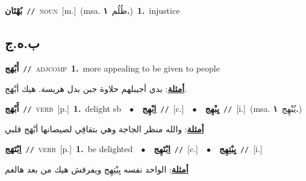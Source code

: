 \documentclass[10pt,a4paper,twoside]{article} %
\begin{document}
\begin{multicols}{2}
{\setlength\topsep{0pt}\textbf{\foreignlanguage{arabic}{بُهْتَان}}\ {\color{gray}\texttt{//}\color{black}}\ \textsc{noun}\ [m.]\ \color{gray}(msa. \foreignlanguage{arabic}{ظُلُم}~\foreignlanguage{arabic}{\textbf{١.}})\color{black}\ \textbf{1.}~injustice\ } \vspace{2mm}

\vspace{-3mm}
\subsection*{\color{blue}\foreignlanguage{arabic}{ب.ه.ج}\color{blue}{}} 

{\setlength\topsep{0pt}\textbf{\foreignlanguage{arabic}{أَبْهَج}}\ {\color{gray}\texttt{//}\color{black}}\ \textsc{adj\textunderscore comp}\ \textbf{1.}~more appealing to be given to people\  \begin{flushright}\color{gray}\foreignlanguage{arabic}{\textbf{\underline{\foreignlanguage{arabic}{أمثلة}}}: بدي أجيبلهم حلاوة جبن بدل هريسة. هيك أبْهَج.}\end{flushright}\color{black}} \vspace{2mm}

{\setlength\topsep{0pt}\textbf{\foreignlanguage{arabic}{أَبْهَج}}\ {\color{gray}\texttt{//}\color{black}}\ \textsc{verb}\ [p.]\ \textbf{1.}~delight sb\ \ $\bullet$\ \ \setlength\topsep{0pt}\textbf{\foreignlanguage{arabic}{اِبْهِج}}\ {\color{gray}\texttt{//}\color{black}}\ [c.]\ \ $\bullet$\ \ \setlength\topsep{0pt}\textbf{\foreignlanguage{arabic}{يِبْهِج}}\ {\color{gray}\texttt{//}\color{black}}\ [i.]\ \color{gray}(msa. \foreignlanguage{arabic}{يُبْهِج}~\foreignlanguage{arabic}{\textbf{١.}})\color{black}\  \begin{flushright}\color{gray}\foreignlanguage{arabic}{\textbf{\underline{\foreignlanguage{arabic}{أمثلة}}}: والله منظر الجاجة وهي بتقاقِي لصيصانها أبْهَج قلبي}\end{flushright}\color{black}} \vspace{2mm}

{\setlength\topsep{0pt}\textbf{\foreignlanguage{arabic}{اِبْتَهَج}}\ {\color{gray}\texttt{//}\color{black}}\ \textsc{verb}\ [p.]\ \textbf{1.}~be delighted\ \ $\bullet$\ \ \setlength\topsep{0pt}\textbf{\foreignlanguage{arabic}{اِبْتَهِج}}\ {\color{gray}\texttt{//}\color{black}}\ [c.]\ \ $\bullet$\ \ \setlength\topsep{0pt}\textbf{\foreignlanguage{arabic}{يِبْتِهِج}}\ {\color{gray}\texttt{//}\color{black}}\ [i.]\  \begin{flushright}\color{gray}\foreignlanguage{arabic}{\textbf{\underline{\foreignlanguage{arabic}{أمثلة}}}: الواحد نفسه يِبْتِهِج ويفرفش هيك من بعد هالغم}\end{flushright}\color{black}} \vspace{2mm}


\end{multicols}
\end{document}
